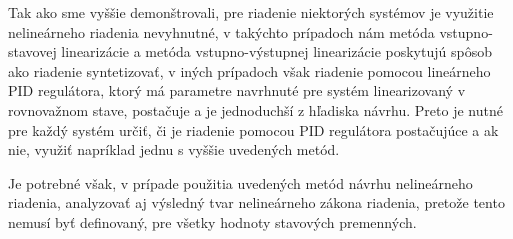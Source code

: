 \documentclass[../main.tex]{subfiles}
\begin{document}
    Tak ako sme vyššie demonštrovali, pre riadenie niektorých systémov je využitie nelineárneho riadenia nevyhnutné, v takýchto prípadoch nám metóda vstupno-stavovej linearizácie a metóda vstupno-výstupnej linearizácie poskytujú spôsob ako riadenie syntetizovať, v iných prípadoch však riadenie pomocou lineárneho PID regulátora, ktorý má parametre navrhnuté pre systém linearizovaný v rovnovažnom stave, postačuje a je jednoduchší z hľadiska návrhu. Preto je nutné pre každý systém určiť, či je riadenie pomocou PID regulátora postačujúce a ak nie, využiť napríklad jednu s vyššie uvedených metód.

    Je potrebné však, v prípade použitia uvedených metód návrhu nelineárneho riadenia, analyzovať aj výsledný tvar nelineárneho zákona riadenia, pretože tento nemusí byť definovaný, pre všetky hodnoty stavových premenných.
\end{document}
